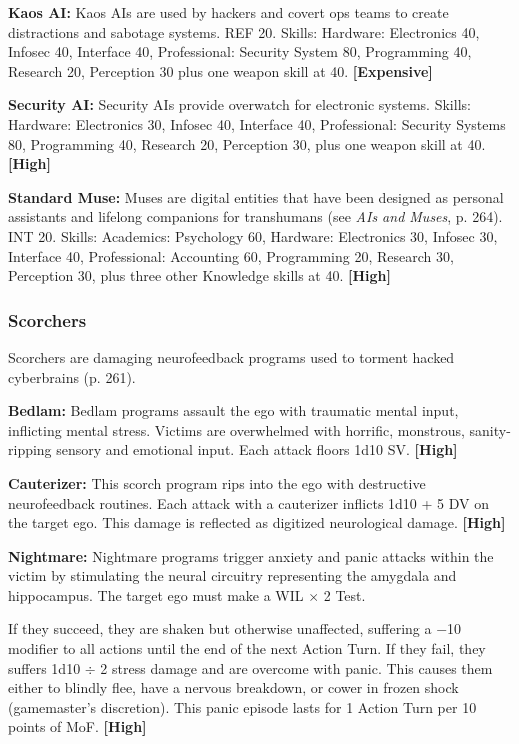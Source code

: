 \textbf{Kaos AI:} Kaos AIs are used by hackers and covert ops teams to create distractions and sabotage systems. REF 20. Skills: Hardware: Electronics 40, Infosec 40, Interface 40, Professional: Security System 80, Programming 40, Research 20, Perception 30 plus one weapon skill at 40. \textbf{[Expensive]}

\textbf{Security AI:} Security AIs provide overwatch for electronic systems. Skills: Hardware: Electronics 30, Infosec 40, Interface 40, Professional: Security Systems 80, Programming 40, Research 20, Perception 30, plus one weapon skill at 40. \textbf{[High]}

\textbf{Standard Muse:} Muses are digital entities that have been designed as personal assistants and lifelong companions for transhumans (see \emph{AIs and Muses}, p. 264). INT 20. Skills: Academics: Psychology 60, Hardware: Electronics 30, Infosec 30, Interface 40, Professional: Accounting 60, Programming 20, Research 30, Perception 30, plus three other Knowledge skills at 40. \textbf{[High]}

\subsubsection{Scorchers}

Scorchers are damaging neurofeedback programs used to torment hacked cyberbrains (p. 261).

\textbf{Bedlam:} Bedlam programs assault the ego with traumatic mental input, inflicting mental stress. Victims are overwhelmed with horrific, monstrous, sanity-ripping sensory and emotional input. Each attack floors 1d10 SV. \textbf{[High]}

\textbf{Cauterizer:} This scorch program rips into the ego with destructive neurofeedback routines. Each attack with a cauterizer inflicts 1d10 + 5 DV on the target ego. This damage is reflected as digitized neurological damage. \textbf{[High]}

\textbf{Nightmare:} Nightmare programs trigger anxiety and panic attacks within the victim by stimulating the neural circuitry representing the amygdala and hippocampus. The target ego must make a WIL $\times$ 2 Test.

If they succeed, they are shaken but otherwise unaffected, suffering a $-$10 modifier to all actions until the end of the next Action Turn. If they fail, they suffers 1d10 $\div$ 2 stress damage and are overcome with panic. This causes them either to blindly flee, have a nervous breakdown, or cower in frozen shock (gamemaster’s discretion). This panic episode lasts for 1 Action Turn per 10 points of MoF. \textbf{[High]}

